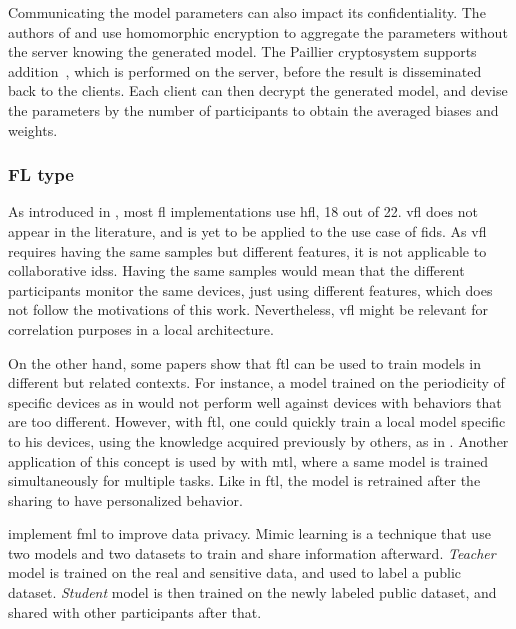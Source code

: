 Communicating the model parameters can also impact its confidentiality.
The authors of \cite{li_DeepFedFederatedDeep_2020} and \cite{li_DeepFedFederatedDeep_2020b} use homomorphic encryption to aggregate the parameters without the server knowing the generated model.
The Paillier cryptosystem supports addition~\cite{Paillier1999}, which is performed on the server, before the result is disseminated back to the clients.
Each client can then decrypt the generated model, and devise the parameters by the number of participants to obtain the averaged biases and weights.

\subsubsection{FL type}
\label{sec:sota.quali.type}

As introduced in , most \gls{fl} implementations use \gls{hfl}, 18 out of 22.
\Gls{vfl} does not appear in the literature, and is yet to be applied to the use case of \gls{fids}.
As \gls{vfl} requires having the same samples but different features, it is not applicable to collaborative \glspl{ids}.
Having the same samples would mean that the different participants monitor the same devices, just using different features, which does not follow the motivations of this work.
Nevertheless, \gls{vfl} might be relevant for correlation purposes in a local architecture.


On the other hand, some papers show that \gls{ftl} can be used to train models in different but related contexts.
For instance, a model trained on the periodicity of specific devices as in \cite{pahl_AllEyesYou_2018,nguyen_DIoTFederatedSelflearning_2019} would not perform well against devices with behaviors that are too different.
However, with \gls{ftl}, one could quickly train a local model specific to his devices, using the knowledge acquired previously by others, as in \cite{fan_IoTDefenderFederatedTransfer_2020}.
Another application of this concept is used by \cite{zhao_MultiTaskNetworkAnomaly_2019} with \gls{mtl}, where a same model is trained simultaneously for multiple tasks.
Like in \gls{ftl}, the model is retrained after the sharing to have personalized behavior.

\textcite{al-athbaal-marri_FederatedMimicLearning_2020} implement \gls{fml} to improve data privacy.
Mimic learning is a technique that use two models and two datasets to train and share information afterward.
\emph{Teacher} model is trained on the real and sensitive data, and used to label a public dataset.
\emph{Student} model is then trained on the newly labeled public dataset, and shared with other participants after that.

